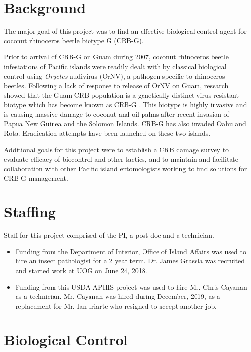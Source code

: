 \documentclass[12pt,letterpaper,english,bibliography=totocnumbered,abstract=on]{scrartcl}
\begin{document}
\section{Background}

The major goal of this project was to find an effective biological
control agent for coconut rhinoceros beetle biotype G (CRB-G).

Prior to arrival of CRB-G on Guam during 2007, coconut rhinoceros beetle
infestations of Pacific islands were readily dealt with by classical
biological control using \textit{Oryctes} nudivirus (OrNV), a pathogen specific to rhinoceros beetles. 
Following a lack
of response to release of OrNV on Guam, research showed that the Guam
CRB population is a genetically distinct virus-resistant biotype which
has become known as CRB-G \cite{marshall_new_2017-1}. This biotype is highly invasive and is
causing massive damage to coconut and oil palms after recent invasion of Papua New Guinea
and the Solomon Islands. CRB-G has also invaded Oahu and Rota. Eradication
attempts have been launched on these two islands.

Additional goals for this project were to establish a CRB damage survey to evaluate efficacy of biocontrol and other tactics, and to maintain and facilitate collaboration with other Pacific island entomologists working to find solutions for CRB-G management.

\section{Staffing}

Staff for this project comprised of the PI, a post-doc and a technician. 

\begin{itemize}
	
\item Funding from the Department of Interior, Office of Island Affairs
was used to hire an insect pathologist for a 2 year term. Dr. James
Grasela was recruited and started work at UOG on June 24, 2018.

\item Funding from this USDA-APHIS project was used to hire Mr. Chris Cayanan as a technician. Mr. Cayanan was hired during December, 2019, as a replacement for Mr. Ian Iriarte who resigned to accept another job.

\end{itemize}

\section{Biological Control}
\end{document}
